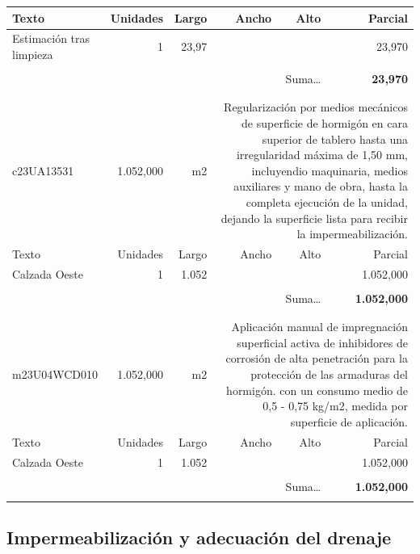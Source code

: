 \documentclass{book}%
\begin{document}
\begin{longtable}{lrrrrr}
Texto&Unidades&Largo&Ancho&Alto&Parcial\\%
\hline%
\multicolumn{1}{p{3.5cm}}{Estimación tras limpieza}&1&23,97&&&    23,970\\%
&&&&&\\%
\multicolumn{5}{r}{Suma\ldots}&\textbf{    23,970}\\%
\hline%
&&&&&\\%
&&&&&\\%
c23UA13531& 1.052,000& m2&\multicolumn{3}{p{6cm}}{\scriptsize Regularización por medios mecánicos de superficie de hormigón en cara superior de tablero hasta una irregularidad máxima de 1,50 mm, incluyendio maquinaria, medios auxiliares y mano de obra, hasta la completa ejecución de la unidad, dejando la superficie lista para recibir la impermeabilización.\normalsize}\\%
Texto&Unidades&Largo&Ancho&Alto&Parcial\\%
\hline%
\multicolumn{1}{p{3.5cm}}{Calzada Oeste}&1&1.052&&& 1.052,000\\%
&&&&&\\%
\multicolumn{5}{r}{Suma\ldots}&\textbf{ 1.052,000}\\%
\hline%
&&&&&\\%
&&&&&\\%
m23U04WCD010& 1.052,000& m2&\multicolumn{3}{p{6cm}}{\scriptsize Aplicación manual de impregnación superficial activa de inhibidores de corrosión de alta penetración para la protección de las armaduras del hormigón. con un consumo medio de 0,5 - 0,75 kg/m2, medida por superficie de aplicación.\normalsize}\\%
Texto&Unidades&Largo&Ancho&Alto&Parcial\\%
\hline%
\multicolumn{1}{p{3.5cm}}{Calzada Oeste}&1&1.052&&& 1.052,000\\%
&&&&&\\%
\multicolumn{5}{r}{Suma\ldots}&\textbf{ 1.052,000}\\%
\hline%
&&&&&\\%
\end{longtable}%
\newpage

%
\subsection{Impermeabilización y adecuación del drenaje}%
\end{document}
